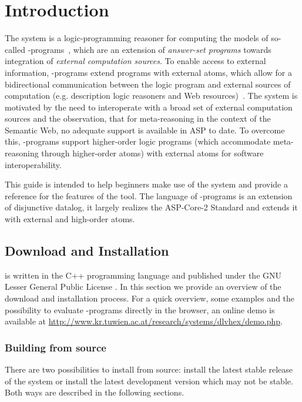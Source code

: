 \documentclass[a4paper, titlepage]{article}
\begin{document}
\setcounter{tocdepth}{2}
\tableofcontents


\newpage
\section{Introduction} %
\label{sec:intro}
The \dlvhex{} system is a logic-programming reasoner for 
computing the models of so-called \hex{}-programs~\cite{efikrs2015}, which 
are an extension of \emph{answer-set programs} towards 
integration of \emph{external computation sources}. To 
enable access to external information, \hex{}-programs 
extend programs with external atoms, which allow for a 
bidirectional communication between the logic program and 
external sources of computation (e.g. description logic 
reasoners and Web resources)~\cite{efkr2012}.
The system is motivated by the need to interoperate with a 
broad set of external computation sources and the 
observation, that for meta-reasoning in the context of the 
Semantic Web, no adequate support is available in ASP to 
date.
To overcome this, \hex{}-programs support higher-order logic programs 
(which accommodate meta-reasoning through higher-order 
atoms) with external atoms for software interoperability.

This guide is intended to help beginners make use of the system and 
provide a reference for the features of the tool.
The language of \hex{}-programs is an extension of disjunctive datalog,
it largely realizes the ASP-Core-2 Standard \cite{cffiklrs2013}
and extends it with external and high-order atoms. 


\subsection{Download and Installation}
\dlvhex{} is written in the C++ programming language
and published under the GNU Lesser General 
Public License \cite{licnc}. 
In this section we provide an overview of the 
download and installation process. For a quick overview, 
some examples and the possibility to evaluate 
\hex{}-programs directly in the browser,
an online demo is available at
\url{http://www.kr.tuwien.ac.at/research/systems/dlvhex/demo.php}.

\subsubsection{Building from source}
There are two possibilities to install \dlvhex{} 
from source: install the latest stable release of the 
system or install the latest development version which may 
not be stable. Both ways are described in the following 
sections.  
\end{document}
